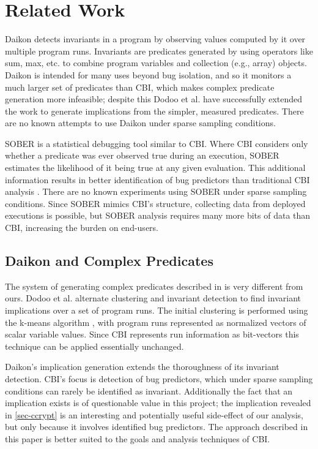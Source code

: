 
\section{Related Work}
\label{sec-rw}
Daikon \cite{ErnstPGMPTX2006} detects invariants in a program by observing values computed by it over multiple program runs.  Invariants are predicates generated by using operators like sum, max, etc. to combine program variables and collection (e.g., array) objects.  Daikon is intended for many uses beyond bug isolation, and so it monitors a much larger set of predicates than CBI, which makes complex predicate generation more infeasible; despite this Dodoo et al. \cite{ErnstDRAFT} have successfully extended the work to generate implications from the simpler, measured predicates.  There are no known attempts to use Daikon under sparse sampling conditions.

SOBER \cite{1081753} is a statistical debugging tool similar to CBI.  Where CBI considers only whether a predicate was ever observed true during an execution, SOBER estimates the likelihood of it being true at any given evaluation.  This additional information results in better identification of bug predictors than traditional CBI analysis \cite{1081753}.  There are no known experiments using SOBER under sparse sampling conditions.  Since SOBER mimics CBI's structure, collecting data from deployed executions is possible, but SOBER analysis requires many more bits of data than CBI, increasing the burden on end-users.

\subsection{Daikon and Complex Predicates}
\label{sec-daikon}
The system of generating complex predicates described in \cite{ErnstDRAFT} is very different from ours.  Dodoo et al. alternate clustering and invariant detection to find invariant implications over a set of program runs.  The initial clustering is performed using the k-means algorithm \cite{jain99data}, with program runs represented as normalized vectors of scalar variable values.  Since CBI represents run information as bit-vectors this technique can be applied essentially unchanged.

Daikon's implication generation extends the thoroughness of its invariant detection.  CBI's focus is detection of bug predictors, which under sparse sampling conditions can rarely be identified as invariant.  Additionally the fact that an implication exists is of questionable value in this project; the implication revealed in \autoref{sec-ccrypt} is an interesting and potentially useful side-effect of our analysis, but only because it involves identified bug predictors.  The approach described in this paper is better suited to the goals and analysis techniques of CBI.


